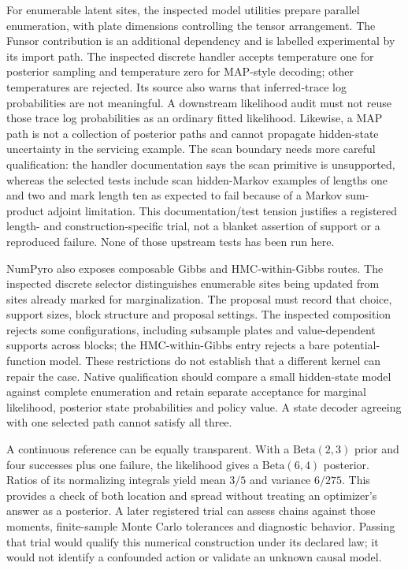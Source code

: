 For enumerable latent sites, the inspected model utilities prepare parallel enumeration, with plate dimensions controlling the tensor arrangement. The Funsor contribution is an additional dependency and is labelled experimental by its import path. The inspected discrete handler accepts temperature one for posterior sampling and temperature zero for MAP-style decoding; other temperatures are rejected. Its source also warns that inferred-trace log probabilities are not meaningful. A downstream likelihood audit must not reuse those trace log probabilities as an ordinary fitted likelihood. Likewise, a MAP path is not a collection of posterior paths and cannot propagate hidden-state uncertainty in the servicing example. The scan boundary needs more careful qualification: the handler documentation says the scan primitive is unsupported, whereas the selected tests include scan hidden-Markov examples of lengths one and two and mark length ten as expected to fail because of a Markov sum-product adjoint limitation. This documentation/test tension justifies a registered length- and construction-specific trial, not a blanket assertion of support or a reproduced failure. None of those upstream tests has been run here. \citep{exec23_numpyro_sources}

NumPyro also exposes composable Gibbs and HMC-within-Gibbs routes. The inspected discrete selector distinguishes enumerable sites being updated from sites already marked for marginalization. The proposal must record that choice, support sizes, block structure and proposal settings. The inspected composition rejects some configurations, including subsample plates and value-dependent supports across blocks; the HMC-within-Gibbs entry rejects a bare potential-function model. These restrictions do not establish that a different kernel can repair the case. Native qualification should compare a small hidden-state model against complete enumeration and retain separate acceptance for marginal likelihood, posterior state probabilities and policy value. A state decoder agreeing with one selected path cannot satisfy all three. \citep{exec23_numpyro_sources}

A continuous reference can be equally transparent. With a $\mathrm{Beta}(2,3)$ prior and four successes plus one failure, the likelihood gives a $\mathrm{Beta}(6,4)$ posterior. Ratios of its normalizing integrals yield mean $3/5$ and variance $6/275$. This provides a check of both location and spread without treating an optimizer's answer as a posterior. A later registered trial can assess chains against those moments, finite-sample Monte Carlo tolerances and diagnostic behavior. Passing that trial would qualify this numerical construction under its declared law; it would not identify a confounded action or validate an unknown causal model. \citep{exec23_numpyro_reference}

